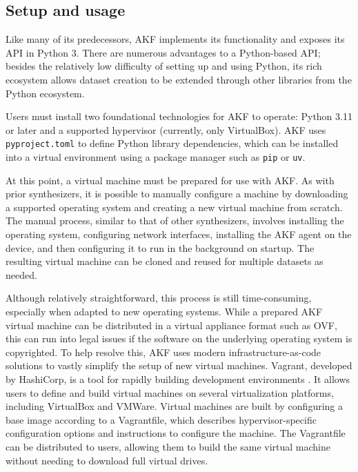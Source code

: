 \subsection{Setup and usage}\label{setup-and-usage}

Like many of its predecessors, AKF implements its functionality and
exposes its API in Python 3. There are numerous advantages to a
Python-based API; besides the relatively low difficulty of setting up
and using Python, its rich ecosystem allows dataset creation to be
extended through other libraries from the Python ecosystem.

Users must install two foundational technologies for AKF to operate:
Python 3.11 or later and a supported hypervisor (currently, only
VirtualBox). AKF uses \passthrough{\lstinline!pyproject.toml!} to define
Python library dependencies, which can be installed into a virtual
environment using a package manager such as
\passthrough{\lstinline!pip!} or \passthrough{\lstinline!uv!}.

At this point, a virtual machine must be prepared for use with AKF. As
with prior synthesizers, it is possible to manually configure a machine
by downloading a supported operating system and creating a new virtual
machine from scratch. The manual process, similar to that of other
synthesizers, involves installing the operating system, configuring
network interfaces, installing the AKF agent on the device, and then
configuring it to run in the background on startup. The resulting
virtual machine can be cloned and reused for multiple datasets as
needed.

Although relatively straightforward, this process is still
time-consuming, especially when adapted to new operating systems. While
a prepared AKF virtual machine can be distributed in a virtual appliance
format such as OVF, this can run into legal issues if the software on
the underlying operating system is copyrighted. To help resolve this,
AKF uses modern infrastructure-as-code solutions to vastly simplify the
setup of new virtual machines. Vagrant, developed by HashiCorp, is a
tool for rapidly building development environments
\citep{HashicorpVagrant2025}. It allows users to define and build
virtual machines on several virtualization platforms, including
VirtualBox and VMWare. Virtual machines are built by configuring a base
image according to a Vagrantfile, which describes hypervisor-specific
configuration options and instructions to configure the machine. The
Vagrantfile can be distributed to users, allowing them to build the same
virtual machine without needing to download full virtual drives.

